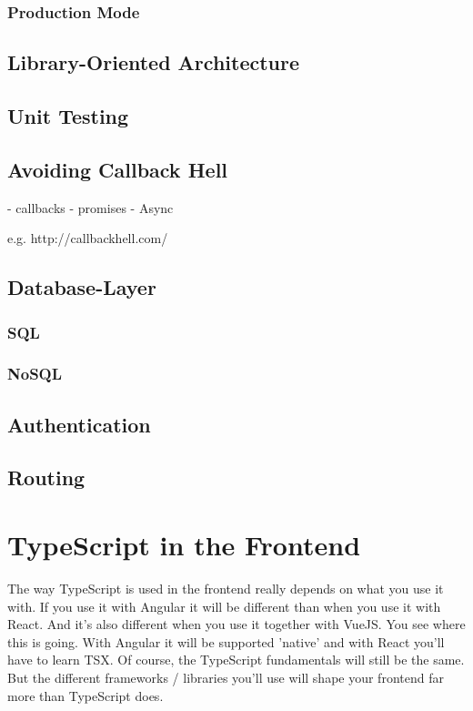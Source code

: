 \documentclass[12pt,a4paper]{report}
\begin{document}
\subsection{Production Mode}

\section{Library-Oriented Architecture}

\section{Unit Testing}

\section{Avoiding Callback Hell}

- callbacks
- promises
- Async

e.g. http://callbackhell.com/



\section{Database-Layer}

\subsection{SQL}

\subsection{NoSQL}

\section{Authentication}

\section{Routing}


\chapter{TypeScript in the Frontend}

The way TypeScript is used in the frontend really depends on what you use it with. If you use it with Angular it will be different than when you use it with React. And it's also different when you use it together with VueJS. You see where this is going. With Angular it will be supported 'native' and with React you'll have to learn TSX. Of course, the TypeScript fundamentals will still be the same. But the different frameworks / libraries you'll use will shape your frontend far more than TypeScript does.
\end{document}
